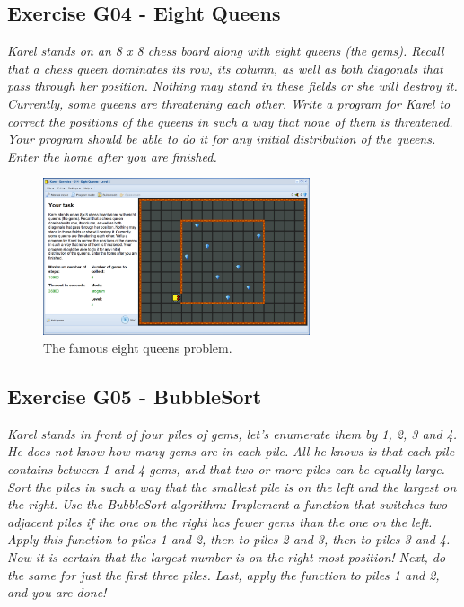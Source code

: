 \documentclass[article,A4,12pt]{llncs}
\begin{document}
{{{{\subsection{Exercise G04 - Eight Queens}

{\em Karel stands on an 8 x 8 chess board along with eight queens (the gems). Recall that a chess queen dominates its row, its column, as well as both diagonals that pass through her position. Nothing may stand in these fields or she will destroy it. Currently, some queens are threatening each other. Write a program for Karel to correct the positions of the queens in such a way that none of them is threatened. Your program should be able to do it for any initial distribution of the queens. Enter the home after you are finished.}

\begin{figure}[!ht]
\begin{center}
\includegraphics[width=0.7\textwidth]{img/g14.png}
\end{center}
\vspace{-4mm}
\caption{The famous eight queens problem.}
\label{fig:g14}
\vspace{-4mm}
\end{figure}
\noindent

\subsection{Exercise G05 - BubbleSort}

{\em Karel stands in front of four piles of gems, let's enumerate them by 1, 2, 3 and 4. He does not know how many gems are in each pile. All he knows is that each pile contains between 1 and 4 gems, and that two or more piles can be equally large. Sort the piles in such a way that the smallest pile is on the left and the largest on the right. Use the BubbleSort algorithm: Implement a function that switches two adjacent piles if the one on the right has fewer gems than the one on the left. Apply this function to piles 1 and 2, then to piles 2 and 3, then to piles 3 and 4. Now it is certain that the largest number is on the right-most position! Next, do the same for just the first three piles. Last, apply the function to piles 1 and 2, and you are done! }

}}}}
\end{document}
